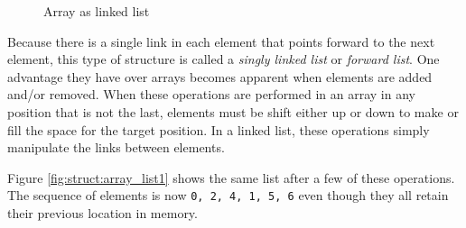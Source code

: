 \begin{figure}[ht]
    \centering
    \caption{Array as linked list}
    \label{fig:struct:array_list0}
\end{figure}

Because there is a single link in each element that points forward to the next
element, this type of structure is called a \textit{singly linked list} or
\textit{forward list}.  One advantage they have over arrays becomes apparent
when elements are added and/or removed.  When these operations are performed in
an array in any position that is not the last, elements must be shift either up
or down to make or fill the space for the target position.  In a linked list,
these operations simply manipulate the links between elements.

Figure \ref{fig:struct:array_list1} shows the same list after a few of these
operations.  The sequence of elements is now \texttt{0, 2, 4, 1, 5, 6} even
though they all retain their previous location in memory.

